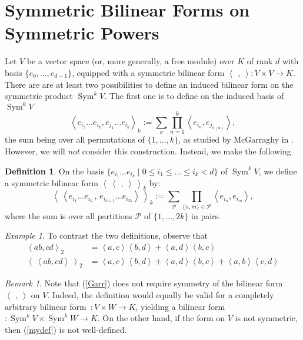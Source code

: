 \documentclass{amsart}
\DeclareMathOperator{\Sym}{Sym}
\newcommand{\coloneqq}{:=}
\newcommand{\bra}{\left<\!\!\!\:\left<}
\newcommand{\ket}{\right>\!\!\!\:\right>}
\theoremstyle{plain}
\theoremstyle{definition}
\newtheorem{definition}[theorem]{Definition}
\theoremstyle{remark}
\newtheorem{remark}[theorem]{Remark}
\newtheorem{example}[theorem]{Example}
\begin{document}
\section{Symmetric Bilinear Forms on Symmetric Powers}
Let $V$ be a vector space (or, more generally, a free module) over $K$ of rank $d$ with basis $\{e_0,\ldots,e_{d-1}\}$, equipped with a symmetric bilinear form $\left<\,\ ,\ \right>: V\times V \rightarrow K$. There are
are at least two possibilities to define an induced bilinear form on the symmetric product $\Sym^kV$. The first one is to define on the induced basis of $\Sym^kV$
\begin{equation}\label{Garr}
\left< e_{i_1}\ldots e_{i_k}, e_{j_1}\ldots e_{i_k}\right>_k \coloneqq \sum_\sigma  
\prod_{n=1}^k \left< e_{i_n},e_{j_{\sigma(n)}}\right>,
\end{equation}
the sum being over all permutations of $\{1,\ldots,k\}$, as studied by McGarraghy in \cite{McGarr}. However, we will \emph{not} consider 
this construction. Instead, we make the following
\begin{definition} On the basis $\{e_{i_1}\ldots e_{i_k}\;|\;0\leq i_1\leq\ldots\leq i_k<d\}$ of $\Sym^kV$, we define a symmetric bilinear form $\bra\ \,,\ \ket_k$ by: 
\begin{equation}
\label{mydef}
\bra e_{i_1}\ldots e_{i_k}\,,\,e_{i_{k+1}}\ldots e_{i_{2k}} \ket_k \coloneqq \sum_{\mathcal{P}} \prod_{\{n,m\}\in\mathcal{P}} \left<e_{i_n},e_{i_m}\right>,
\end{equation}
where the sum is over all partitions $\mathcal{P}$ of $\{1,\ldots,2k\}$ in pairs.
\end{definition}
\begin{example}
To contrast the two definitions, observe that 
\begin{align}
\left<ab,cd\right>_2 &= \left<a,c\right>\left<b,d\right>+\left<a,d\right>\left<b,c\right> \\
\bra ab,cd\ket_2 &= \left<a,c\right>\left<b,d\right>+\left<a,d\right>\left<b,c\right> + \left<a,b\right>\left<c,d\right> 
\end{align}
\end{example}
\begin{remark}
Note that (\ref{Garr}) does not require symmetry of the bilinear form $\left<\,\ ,\ \right>$ on $V$. Indeed, the definition would equally be valid for a completely arbitrary bilinear form~$: V\times W \rightarrow K$, yielding a bilinear form $:\Sym^kV\times\Sym^kW\rightarrow K$. On the other hand, if the form on $V$ is not symmetric, then (\ref{mydef}) is not well-defined.
\end{remark}
\end{document}
